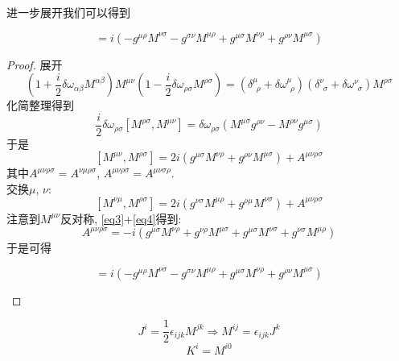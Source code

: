 进一步展开我们可以得到
\begin{theorem}[$M^{\mu\nu}$的对易子]\label{M-commutator}
    \begin{equation}
        [M^{\mu\nu}, M^{\rho\sigma}]=i(-g^{\mu\rho}M^{\nu\sigma}-g^{\sigma\nu}M^{\mu\rho}+g^{\mu\sigma}M^{\nu\rho}+g^{\rho\nu}M^{\mu\sigma})
    \end{equation}
\end{theorem}
\begin{proof}
    展开
    \begin{equation}
        (1+\frac i 2\delta \omega_{\alpha\beta}M^{\alpha\beta})M^{\mu\nu}(1-\frac i 2\delta \omega_{\rho\sigma}M^{\rho\sigma})=(\delta^\mu_{~~\rho}+\delta\omega^\mu_{~~\rho})(\delta^\nu_{~~\sigma}+\delta\omega^\nu_{~~\sigma})M^{\rho\sigma}
    \end{equation}
    化简整理得到
    \begin{equation}
        \frac i2\delta\omega_{\rho\sigma}[M^{\rho\sigma}, M^{\mu\nu}]=\delta\omega_{\rho\sigma}(M^{\mu\sigma}g^{\rho\nu}-M^{\rho\nu}g^{\mu\sigma})
    \end{equation}
    于是
    \begin{equation}\label{eq3}
        [M^{\mu\nu}, M^{\rho\sigma}]=2i(g^{\mu\sigma}M^{\nu\rho}+g^{\rho\nu}M^{\mu\sigma})+A^{\mu\nu\rho\sigma}
    \end{equation}
    其中$A^{\mu\nu\rho\sigma}=A^{\nu\mu\rho\sigma}$, $A^{\mu\nu\rho\sigma}=A^{\mu\nu\sigma\rho}$.\\
    交换$\mu$, $\nu$:
    \begin{equation}\label{eq4}
        [M^{\nu\mu}, M^{\rho\sigma}]=2i(g^{\nu\sigma}M^{\mu\rho}+g^{\rho\mu}M^{\nu\sigma})+A^{\mu\nu\rho\sigma}
    \end{equation}
    注意到$M^{\mu\nu}$反对称, \eqref{eq3}+\eqref{eq4}得到:
    \begin{equation}
        A^{\mu\nu\rho\sigma}=-i(g^{\mu\sigma}M^{\nu\rho}+g^{\nu\rho}M^{\mu\sigma}+g^{\mu\sigma}M^{\nu\sigma}+g^{\nu\sigma}M^{\mu\rho})
    \end{equation}
    于是可得
    \begin{important}
        \begin{equation}
            [M^{\mu\nu}, M^{\rho\sigma}]=i(-g^{\mu\rho}M^{\nu\sigma}-g^{\sigma\nu}M^{\mu\rho}+g^{\mu\sigma}M^{\nu\rho}+g^{\rho\nu}M^{\mu\sigma})
        \end{equation}
    \end{important}
\end{proof}
\begin{definition}[Lorentz群生成元]\label{lorentz-generators}
    \begin{equation}
        J^i =\frac12\epsilon_{ijk}M^{jk}\Rightarrow M^{ij}=\epsilon_{ijk}J^k
    \end{equation}
    \begin{equation}
        K^i=M^{i0}
    \end{equation}
\end{definition}
